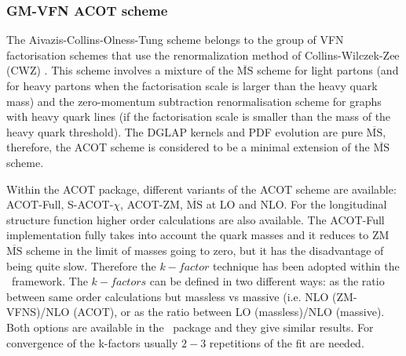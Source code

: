 \subsubsection{GM-VFN ACOT scheme}

The Aivazis-Collins-Olness-Tung scheme belongs to the group of VFN 
factorisation schemes that use the renormalization method of 
Collins-Wilczek-Zee (CWZ) \cite{CWZ}.
This scheme involves a mixture of the $\overline{\text{MS}}$ scheme 
for light partons (and for heavy partons when the factorisation scale 
is larger than the heavy quark mass) and the zero-momentum subtraction 
renormalisation scheme for graphs with heavy quark lines 
(if the factorisation scale is smaller than the mass of the heavy quark threshold). 
The DGLAP kernels and PDF evolution are pure $\overline{\text{MS}}$, 
therefore, the ACOT scheme is considered to be a minimal extension of the $\overline{\text{MS}}$ scheme.

Within the ACOT package, different variants of the ACOT scheme are available:
ACOT-Full, S-ACOT-$\chi$, ACOT-ZM, $\overline{\text{MS}}$ at LO and NLO. 
For the longitudinal structure function higher order calculations are also available. 
The ACOT-Full implementation fully takes into account the quark masses 
and it reduces to ZM $\overline{\text{MS}}$ scheme in the limit of masses going to zero, 
but it has the disadvantage of being quite slow.
Therefore the $k-factor$ technique has been adopted within the \fitter\ framework. 
The $k-factors$ can be defined in two different ways:
as the ratio between same order calculations but massless vs massive 
(i.e. NLO (ZM-VFNS)/NLO (ACOT), or as the ratio between LO (massless)/NLO (massive).
Both options are available in the \fitter\ package and they give similar results. 
For convergence of the k-factors usually $2-3$ repetitions of the fit are needed.
%
%

